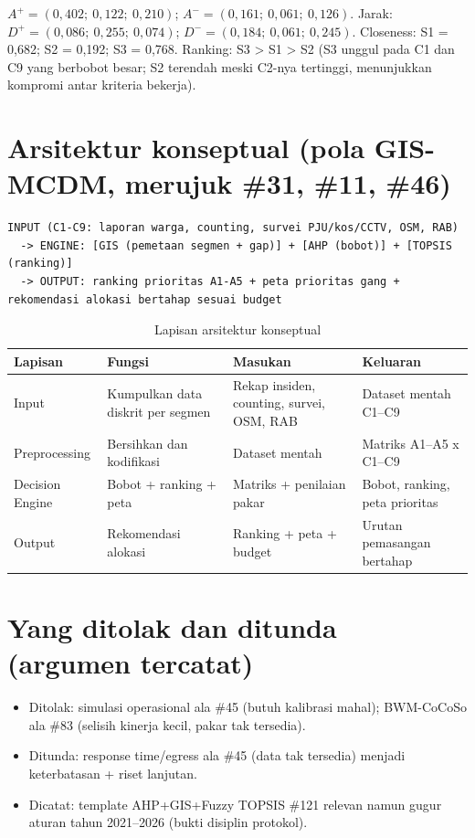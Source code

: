 \documentclass[a4paper,11pt]{article}
\begin{document}
\(A^+ = (0{,}402;\ 0{,}122;\ 0{,}210)\); \(A^- = (0{,}161;\ 0{,}061;\ 0{,}126)\). Jarak: \(D^+ = (0{,}086;\ 0{,}255;\ 0{,}074)\); \(D^- = (0{,}184;\ 0{,}061;\ 0{,}245)\). Closeness: S1 = 0,682; S2 = 0,192; S3 = 0,768. Ranking: S3 \textgreater{} S1 \textgreater{} S2 (S3 unggul pada C1 dan C9 yang berbobot besar; S2 terendah meski C2-nya tertinggi, menunjukkan kompromi antar kriteria bekerja).

\section{Arsitektur konseptual (pola GIS-MCDM, merujuk \#31, \#11, \#46)}

\begin{verbatim}
INPUT (C1-C9: laporan warga, counting, survei PJU/kos/CCTV, OSM, RAB)
  -> ENGINE: [GIS (pemetaan segmen + gap)] + [AHP (bobot)] + [TOPSIS (ranking)]
  -> OUTPUT: ranking prioritas A1-A5 + peta prioritas gang + rekomendasi alokasi bertahap sesuai budget
\end{verbatim}

\begin{table}[htbp]
\centering
\begin{tabular}{p{2.5cm}p{4.5cm}p{4cm}p{3.5cm}}
\toprule
\textbf{Lapisan} & \textbf{Fungsi} & \textbf{Masukan} & \textbf{Keluaran} \\
\midrule
Input & Kumpulkan data diskrit per segmen & Rekap insiden, counting, survei, OSM, RAB & Dataset mentah C1--C9 \\
Preprocessing & Bersihkan dan kodifikasi & Dataset mentah & Matriks A1--A5 x C1--C9 \\
Decision Engine & Bobot + ranking + peta & Matriks + penilaian pakar & Bobot, ranking, peta prioritas \\
Output & Rekomendasi alokasi & Ranking + peta + budget & Urutan pemasangan bertahap \\
\bottomrule
\end{tabular}
\caption{Lapisan arsitektur konseptual}
\end{table}

\section{Yang ditolak dan ditunda (argumen tercatat)}

\begin{itemize}
\item Ditolak: simulasi operasional ala \#45 (butuh kalibrasi mahal); BWM-CoCoSo ala \#83 (selisih kinerja kecil, pakar tak tersedia).
\item Ditunda: response time/egress ala \#45 (data tak tersedia) menjadi keterbatasan + riset lanjutan.
\item Dicatat: template AHP+GIS+Fuzzy TOPSIS \#121 relevan namun gugur aturan tahun 2021--2026 (bukti disiplin protokol).
\end{itemize}
\end{document}
